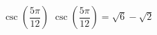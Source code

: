 {$\csc \left( \dfrac{5\pi}{12} \right)$}
{$\csc \left( \dfrac{5\pi}{12} \right) = \sqrt{6} - \sqrt{2}$}

